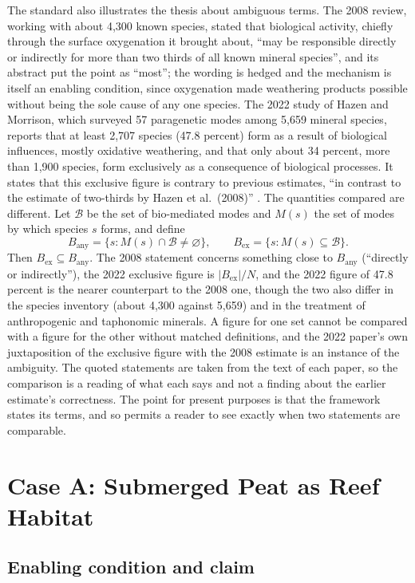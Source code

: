 \documentclass[11pt]{article}
\theoremstyle{definition}
\theoremstyle{remark}
\begin{document}
The standard also illustrates the thesis about ambiguous terms. The 2008 review, working with about 4,300 known species, stated that biological activity, chiefly through the surface oxygenation it brought about, ``may be responsible directly or indirectly for more than two thirds of all known mineral species'', and its abstract put the point as ``most''; the wording is hedged and the mechanism is itself an enabling condition, since oxygenation made weathering products possible without being the sole cause of any one species. The 2022 study of Hazen and Morrison, which surveyed 57 paragenetic modes among 5,659 mineral species, reports that at least 2,707 species (47.8 percent) form as a result of biological influences, mostly oxidative weathering, and that only about 34 percent, more than 1,900 species, form exclusively as a consequence of biological processes. It states that this exclusive figure is contrary to previous estimates, ``in contrast to the estimate of two-thirds by Hazen et al.\ (2008)'' \cite{hazen2022}. The quantities compared are different. Let $\mathcal{B}$ be the set of bio-mediated modes and $M(s)$ the set of modes by which species $s$ forms, and define
\[
B_{\mathrm{any}}=\{s: M(s)\cap\mathcal{B}\neq\varnothing\},\qquad B_{\mathrm{ex}}=\{s: M(s)\subseteq\mathcal{B}\}.
\]
Then $B_{\mathrm{ex}}\subseteq B_{\mathrm{any}}$. The 2008 statement concerns something close to $B_{\mathrm{any}}$ (``directly or indirectly''), the 2022 exclusive figure is $|B_{\mathrm{ex}}|/N$, and the 2022 figure of 47.8 percent is the nearer counterpart to the 2008 one, though the two also differ in the species inventory (about 4,300 against 5,659) and in the treatment of anthropogenic and taphonomic minerals. A figure for one set cannot be compared with a figure for the other without matched definitions, and the 2022 paper's own juxtaposition of the exclusive figure with the 2008 estimate is an instance of the ambiguity. The quoted statements are taken from the text of each paper, so the comparison is a reading of what each says and not a finding about the earlier estimate's correctness. The point for present purposes is that the framework states its terms, and so permits a reader to see exactly when two statements are comparable.

\section{Case A: Submerged Peat as Reef Habitat}

\subsection{Enabling condition and claim}
\end{document}
